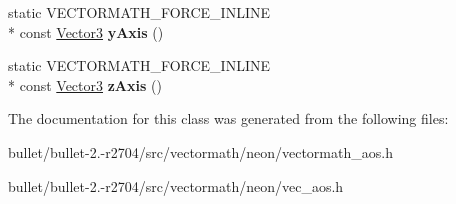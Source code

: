 \begin{DoxyCompactItemize}
\item 
\hypertarget{class_vectormath_1_1_aos_1_1_vector3_a09dcdf16938b37751a0a8df7f31e6b72}{static V\+E\+C\+T\+O\+R\+M\+A\+T\+H\+\_\+\+F\+O\+R\+C\+E\+\_\+\+I\+N\+L\+I\+N\+E \\*
const \hyperlink{class_vectormath_1_1_aos_1_1_vector3}{Vector3} {\bfseries y\+Axis} ()}\label{class_vectormath_1_1_aos_1_1_vector3_a09dcdf16938b37751a0a8df7f31e6b72}

\item 
\hypertarget{class_vectormath_1_1_aos_1_1_vector3_a010a3e78e88c05641adb6916352297cb}{static V\+E\+C\+T\+O\+R\+M\+A\+T\+H\+\_\+\+F\+O\+R\+C\+E\+\_\+\+I\+N\+L\+I\+N\+E \\*
const \hyperlink{class_vectormath_1_1_aos_1_1_vector3}{Vector3} {\bfseries z\+Axis} ()}\label{class_vectormath_1_1_aos_1_1_vector3_a010a3e78e88c05641adb6916352297cb}

\end{DoxyCompactItemize}


The documentation for this class was generated from the following files\+:\begin{DoxyCompactItemize}
\item 
bullet/bullet-\/2.-\/r2704/src/vectormath/neon/vectormath\+\_\+aos.\+h\item 
bullet/bullet-\/2.-\/r2704/src/vectormath/neon/vec\+\_\+aos.\+h\end{DoxyCompactItemize}
